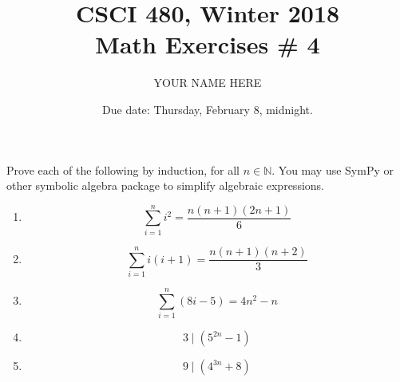 \documentclass{article}
\title{CSCI 480, Winter 2018\\Math Exercises \# 4}
\author{YOUR NAME HERE}
\date{Due date:  Thursday, February 8, midnight.}
\newcommand{\nats}{\ensuremath{\mathbb{N}}}
\begin{document}
\maketitle

Prove each of the following by induction, for all $n\in\nats$.
You may use SymPy or other symbolic algebra package to simplify
algebraic expressions.

\begin{enumerate}
\item
  \[
 \sum_{i=1}^n i^2 = \frac{n(n+1)(2n+1)}{6}
  \]
\item
  \[
 \sum_{i=1}^n i(i+1) = \frac{n(n+1)(n+2)}{3}
  \]
\item
  \[
 \sum_{i=1}^n (8i-5) = 4n^2 - n
 \]
\item
  \[
  3\mid (5^{2n} -1)
  \]
\item
  \[
  9\mid (4^{3n} + 8)
  \]
\end{enumerate}
\end{document}
